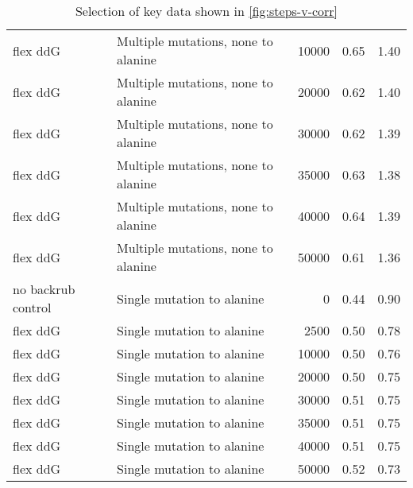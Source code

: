 \begin{table}
\begin{tabular}{llrrr}
           flex ddG &  Multiple mutations, none to alanine &         10000 & 0.65 & 1.40 \\
           flex ddG &  Multiple mutations, none to alanine &         20000 & 0.62 & 1.40 \\
           flex ddG &  Multiple mutations, none to alanine &         30000 & 0.62 & 1.39 \\
           flex ddG &  Multiple mutations, none to alanine &         35000 & 0.63 & 1.38 \\
           flex ddG &  Multiple mutations, none to alanine &         40000 & 0.64 & 1.39 \\
           flex ddG &  Multiple mutations, none to alanine &         50000 & 0.61 & 1.36 \\
 no backrub control &           Single mutation to alanine &             0 & 0.44 & 0.90 \\
           flex ddG &           Single mutation to alanine &          2500 & 0.50 & 0.78 \\
           flex ddG &           Single mutation to alanine &         10000 & 0.50 & 0.76 \\
           flex ddG &           Single mutation to alanine &         20000 & 0.50 & 0.75 \\
           flex ddG &           Single mutation to alanine &         30000 & 0.51 & 0.75 \\
           flex ddG &           Single mutation to alanine &         35000 & 0.51 & 0.75 \\
           flex ddG &           Single mutation to alanine &         40000 & 0.51 & 0.75 \\
           flex ddG &           Single mutation to alanine &         50000 & 0.52 & 0.73 \\
\bottomrule
\end{tabular}

\caption[]{Selection of key data shown in \cref{fig:steps-v-corr}}
\label{tab:steps-v-corr-underlying-data}
\end{table}
